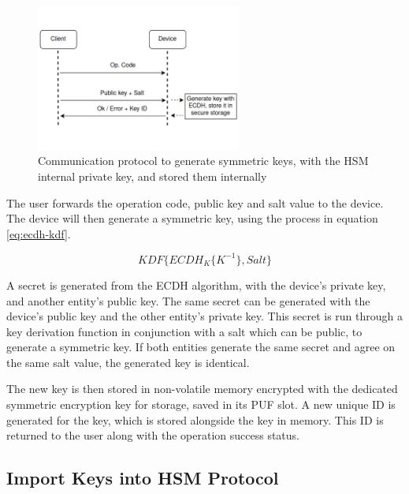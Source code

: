 \begin{figure}[h!]
	\centering
	\includegraphics[width=0.60\textwidth]{./Images/ecdh.png}
	\caption{Communication protocol to generate symmetric keys, with the HSM internal private key, and stored them internally}
	\label{fig:protocol:ecdh}
\end{figure}

The user forwards the operation code, public key and salt value to the device.
The device will then generate a symmetric key, using the process in equation \ref{eq:ecdh-kdf}.

\begin{equation}
	\label{eq:ecdh-kdf}
	KDF\{ECDH_{K}\{K^{-1}\}, Salt\}
\end{equation}

A secret is generated from the \ac{ECDH} algorithm, with the device's private key, and another entity's public key. The same secret can be generated with the device's public key and the other entity's private key. 
This secret is run through a key derivation function in conjunction with a salt which can be public, to generate a symmetric key. If both entities generate the same secret and agree on the same salt value, the generated key is identical.

The new key is then stored in non-volatile memory encrypted with the dedicated symmetric encryption key for storage, saved in its PUF slot.
A new unique ID is generated for the key, which is stored alongside the key in memory. This ID is returned to the user along with the operation success status.

\subsection{Import Keys into HSM Protocol}\label{chap:implementation:protocol:import-keys}

